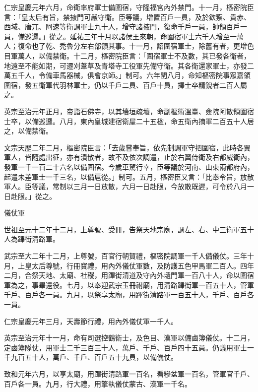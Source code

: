 \begin{pinyinscope}
 仁宗皇慶元年六月，命衛率府軍士備圍宿，守隆福宮內外禁門。十一月，樞密院臣言：「皇太后有旨，禁掖門可嚴守衛。臣等議，增置百戶一員，及於欽察、貴赤、西域、唐兀、阿速等衛調軍士九十人，增守諸掖門，復命千戶一員，帥領百戶一員，備巡邏。」從之。延祐三年十月以諸侯王來朝，命圍宿軍士六千人增至一萬人；復命也了乾、禿魯分左右部領其事。十一月，詔圍宿軍士，除舊有者，更增色目軍萬人，以備禁衛。十二月，樞密院臣言：「圍宿軍士不及數，其已發各衛者，地遠至不能如期，可遷刈葦草及青塔寺工役軍先備守衛。其各衛還家軍士，亦發二萬五千人，令備車馬器械，俱會京師。」制可。六年閏八月，命知樞密院事眾嘉領圍宿，發五衛軍代羽林軍士，仍以千戶二員、百戶十員，擇士卒精銳者二百人屬之。



 英宗至治元年正月，帝詣石佛寺，以其墻垣疏壞，命副樞術溫臺、僉院阿散領圍宿士卒，以備巡邏。八月，東內皇城建宿衛屋二十五楹，命五衛內摘軍二百五十人居之，以備禁衛。



 文宗天歷二年二月，樞密院臣言：「去歲嘗奉旨，依先制調軍守把圍宿，此時各翼軍人，皆隨處出征，亦有潰散者，故不及依次調遣，止於右翼侍衛及右都威衛內，發軍一千一百二十六名以備圍宿。今歲車駕行幸，臣等議於河南、山東兩都府內，起遣未差軍士一千三名，以備扈從。」制可。五月，樞密臣又言：「比奉令旨，放散軍人。臣等議，常制以三月一日放散，六月一日赴限，今放散既遲，可令於八月一日赴限。」從之。



 儀仗軍



 世祖至元十二年十二月，上尊號、受冊，告祭天地宗廟，調左、右、中三衛軍五十人為蹕街清路軍。



 武宗至大二年十二月，上尊號，百官行朝賀禮，樞密院調軍一千人備儀仗。三年十月，上皇太后尊號，行冊寶禮，用內外儀仗軍數，及防護五色甲馬軍二百人。四年二月，合祭天地、太廟、社稷，用蹕街清道及守內外壝門軍一百八十人，命以圍宿軍為之，事畢還役。七月，以奉迎武宗玉冊祔廟，用清路蹕街軍一百五十人，管軍千戶、百戶各一員。九月，以祭享太廟，用蹕街清路軍一百五十人，千戶、百戶各一員。



 仁宗皇慶元年三月，天壽節行禮，用內外儀仗軍一千人。



 英宗至治元年十一月，命有司選控鶴衛士，及色目、漢軍以備鹵簿儀仗。十二月，定鹵簿隊仗，用軍士二千三百三十人，萬戶、千戶、百戶四十五員。仍議用軍士一千九百五十人，萬戶、千戶、百戶五十九員，以備儀仗。



 致和元年六月，以享太廟，用蹕街清路軍一百名，看糝盆軍一百名，管軍官千戶、百戶各一員。九月，行大禮，用擎執儀仗蒙古、漢軍一千名。




\end{pinyinscope}
